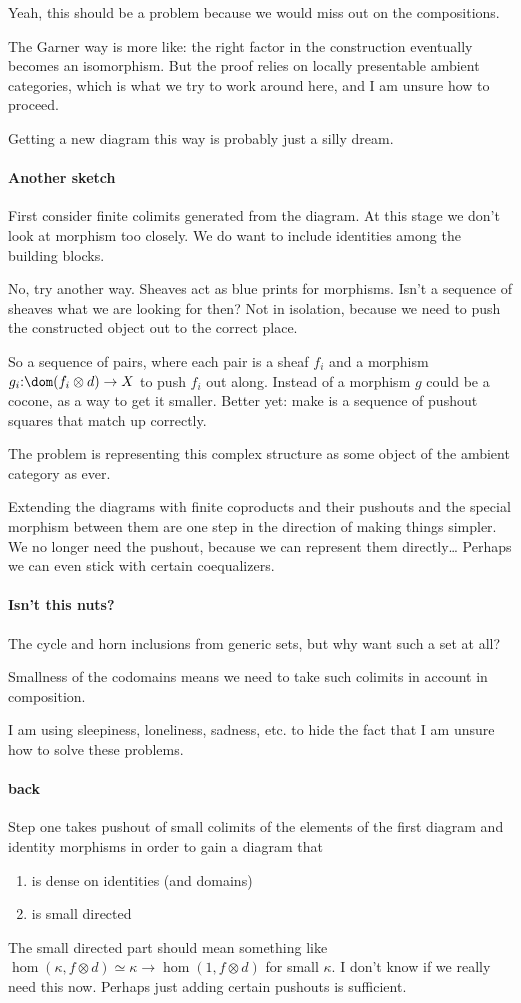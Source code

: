 \documentclass[csh.tex]{subfiles}
\begin{document}
Yeah, this should be a problem because we would miss out on the compositions.

The Garner way is more like: the right factor in the construction eventually becomes an isomorphism. But the proof relies on locally presentable ambient categories, which is what we try to work around here, and I am unsure how to proceed.

Getting a new diagram this way is probably just a silly dream.

\paragraph{Another sketch}
First consider finite colimits generated from the diagram. At this stage we don't look at morphism too closely. We do want to include identities among the building blocks.

No, try another way. Sheaves act as blue prints for morphisms. Isn't a sequence of sheaves what we are looking for then?
Not in isolation, because we need to push the constructed object out to the correct place.

So a sequence of pairs, where each pair is a sheaf $f_i$ and a morphism $g_i\of \dom(f_i\otimes d)\to X$ to push $f_i$ out along.
Instead of a morphism $g$ could be a cocone, as a way to get it smaller.
Better yet: make is a sequence of pushout squares that match up correctly.

The problem is representing this complex structure as some object of the ambient category as ever.

Extending the diagrams with finite coproducts and their pushouts and the special morphism between them are one step in the direction of making things simpler. We no longer need the pushout, because we can represent them directly\dots
Perhaps we can even stick with certain coequalizers.

\paragraph{Isn't this nuts?}
The cycle and horn inclusions from generic sets, but why want such a set at all?

Smallness of the codomains means we need to take such colimits in account in composition. 

I am using sleepiness, loneliness, sadness, etc. to hide the fact that I am unsure how to solve these problems.

\paragraph{back}
Step one takes pushout of small colimits of the elements of the first diagram and identity morphisms in order to gain a diagram that
\begin{enumerate}
\item is dense on identities (and domains)
\item is small directed
\end{enumerate}
The small directed part should mean something like $\hom(\kappa, f\otimes d)\simeq \kappa\to\hom(1,f\otimes d)$ for small $\kappa$. I don't know if we really need this now. Perhaps just adding certain pushouts is sufficient.
\end{document}
